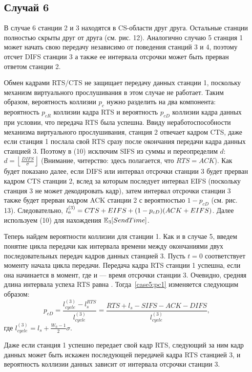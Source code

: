 {\subsection{Случай 6}
В случае 6 станции 2 и 3 находятся в CS-области друг друга. Остальные станции полностью скрыты друг от друга (см. рис. 12). Аналогично случаю 5 станция 1 может начать свою передачу независимо от поведения станций 3 и 4, поэтому отсчет DIFS станции 3 а также ее интервала отсрочки может быть прерван ответом станции 2.

Обмен кадрами RTS/CTS не защищает передачу данных станции 1, поскольку  механизм виртуального прослушивания в этом случае не работает. Таким образом, вероятность коллизии $p_c$ нужно разделить на два компонента: вероятность $p_{cR}$ коллизии кадра RTS и вероятность $p_{cD}$ коллизии кадра данных при условии, что передача RTS была успешна. Ввиду неработоспособности механизма виртуального прослушивания, станция 2 отвечает кадром CTS, даже если станция 1 послала свой RTS сразу после окончания передачи кадра данных станцией 3. Поэтому в (10) исключим SIFS из суммы и переопределим $d$: $d = \left\lfloor \frac{DIFS}{\sigma} \right\rfloor$ (Внимание, читерство: здесь полагается, что $RTS = ACK$).  Как будет показано далее, если DIFS или интервал отсрочки станции 3 будет прерван кадром CTS станции 2, вслед за которым последует интервал EIFS (поскольку станция 3 не может декодировать кадр), затем интервал отсрочки станции 3 также будет прерван кадром ACK станции 2 с вероятностью  $1-p_{cD}$ (см. рис. 13). Следовательно, $l_{a}^{(3)} = CTS + EIFS + (1-p_{cD})(ACK + EIFS)$. Далее используем (10) для нахождения $\mathbb{E}_{3}[SendTime]$.

Теперь найдем вероятности коллизии для станции 1. Как и в случае 5, введем понятие цикла передачи как интервала времени между окончаниями двух последовательных передач кадров данных станцией 3. Пусть $t = 0$  соответствует моменту начала цикла передачи.  Передача кадра RTS станции 1 успешна, если она начинается в момент, где и  --- время отсрочки станции 3. Очевидно, средняя длина интервала  успеха RTS равна . Тогда~\eqref{case5:pc1} изменяется следующим образом:
\begin{equation}
p_{cD} = \frac{l_{cycle}^{(3)} - l_s^{RTS}}{l_{cycle}^{(3)}} = \frac{RTS + l_s - SIFS- ACK - DIFS}{l_{cycle}^{(3)}},
\end{equation}
где $l_{cycle}^{(3)} = l_s + \frac{W_0-1}{2}\sigma$.

Даже если станция 1 успешно передает свой кадр RTS, следующий за ним кадр данных может быть искажен последующей передачей кадра RTS станцией 3, и вероятность коллизии данных зависит от интервала отсрочки станции 3. 

}
